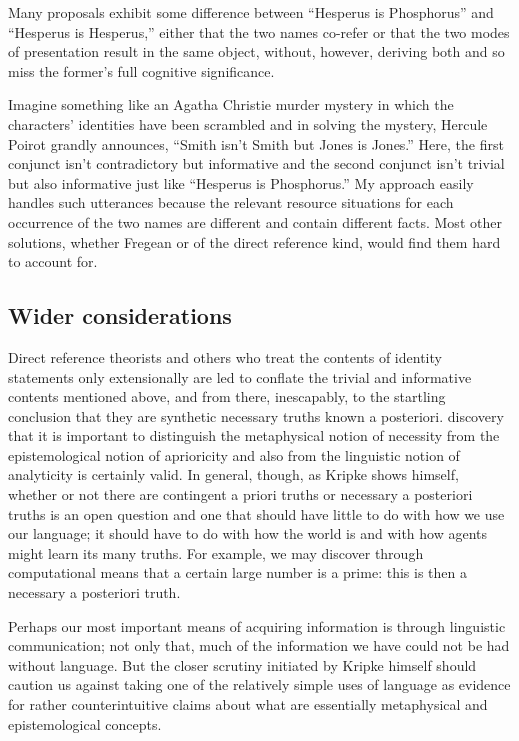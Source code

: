 Many proposals exhibit some difference between ``Hesperus is Phosphorus'' and ``Hesperus is Hesperus,'' either that the two names co-refer or that the two modes of presentation result in the same object, without, however, deriving both and so miss the former's full cognitive significance. 



Imagine something like an Agatha Christie murder mystery in which the characters' identities have been scrambled and in solving the mystery, Hercule Poirot grandly announces, ``Smith isn't Smith but Jones is Jones.'' Here, the first conjunct isn't contradictory but informative and the second conjunct isn't trivial but also informative just like ``Hesperus is Phosphorus.'' My approach easily handles such utterances because the relevant resource situations for each occurrence of the two names are different and contain different facts. Most other solutions, whether Fregean or of the direct reference kind, would find them hard to account for. 


\subsection{Wider considerations}
Direct reference theorists and others who treat the contents of identity statements only extensionally are led to conflate the trivial and informative contents mentioned above, and from there, inescapably, to the startling conclusion that they are synthetic necessary truths known a posteriori.  discovery that it is important to distinguish the metaphysical notion of necessity from the epistemological notion of aprioricity and also from the linguistic notion of analyticity is certainly valid. In general, though, as Kripke shows himself, whether or not there are contingent a priori truths or necessary a posteriori truths is an open question and one that should have little to do with how we use our language; it should have to do with how the world is and with how agents might learn its many truths. For example, we may discover through computational means that a certain large number is a prime: this is then a necessary a posteriori truth.

Perhaps our most important means of acquiring information is through linguistic communication; not only that, much of the information we have could not be had without language.  But the closer scrutiny initiated by Kripke himself should caution us against taking one of the relatively simple uses of language as evidence for rather counterintuitive claims about what are essentially metaphysical and epistemological concepts.


